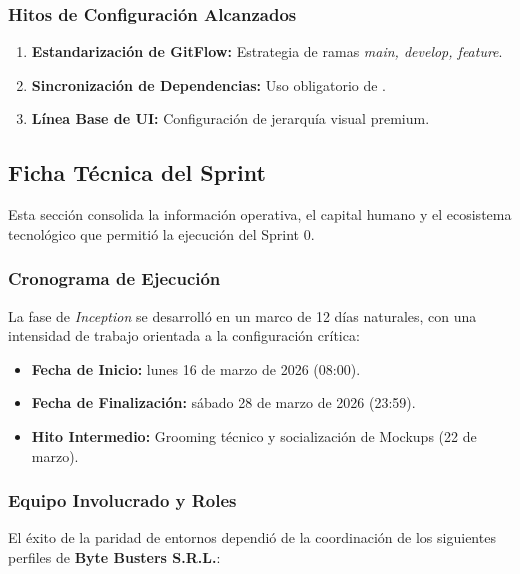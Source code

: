 \subsubsection{Hitos de Configuración Alcanzados}
\begin{enumerate}[noitemsep]
    \item \textbf{Estandarización de GitFlow:} Estrategia de ramas \textit{main, develop, feature}.
    \item \textbf{Sincronización de Dependencias:} Uso obligatorio de .
    \item \textbf{Línea Base de UI:} Configuración de jerarquía visual premium.
\end{enumerate}

\subsection{Ficha Técnica del Sprint}
Esta sección consolida la información operativa, el capital humano y el ecosistema tecnológico que permitió la ejecución del Sprint 0.

\subsubsection{Cronograma de Ejecución}
La fase de \textit{Inception} se desarrolló en un marco de 12 días naturales, con una intensidad de trabajo orientada a la configuración crítica:

\begin{itemize}[noitemsep]
    \item \textbf{Fecha de Inicio:} lunes 16 de marzo de 2026 (08:00).
    \item \textbf{Fecha de Finalización:} sábado 28 de marzo de 2026 (23:59).
    \item \textbf{Hito Intermedio:} Grooming técnico y socialización de Mockups (22 de marzo).
\end{itemize}

\subsubsection{Equipo Involucrado y Roles}
El éxito de la paridad de entornos dependió de la coordinación de los siguientes perfiles de \textbf{Byte Busters S.R.L.}:

